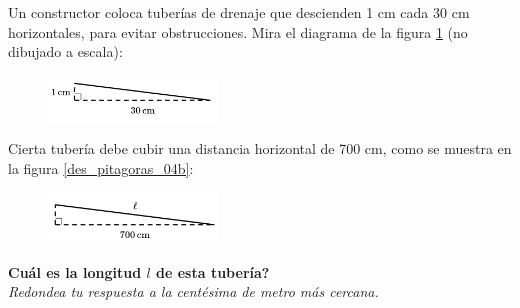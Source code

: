 Un constructor coloca tuberías de drenaje que descienden 1 cm cada 30 cm horizontales,
para evitar obstrucciones. Mira el diagrama de la figura \ref{fig:des_pitagoras_04a} (no dibujado a escala):
\begin{figure}[H]
    \begin{center}
        \includegraphics[width=0.4\textwidth]{../images/des_pitagoras_04a.png}
    \end{center}
    \caption{}
    \label{fig:des_pitagoras_04a}
\end{figure}
Cierta tubería debe cubir una distancia horizontal de 700 cm, como se muestra en la figura \ref{des_pitagoras_04b}:
\begin{figure}[H]
    \begin{center}
        \includegraphics[width=0.4\textwidth]{../images/des_pitagoras_04b.png}
    \end{center}
    \caption{}
    \label{fig:des_pitagoras_04b}
\end{figure}
\textbf{Cuál es la longitud $l$ de esta tubería?}\\
\textit{Redondea tu respuesta a la centésima de metro más cercana.}
